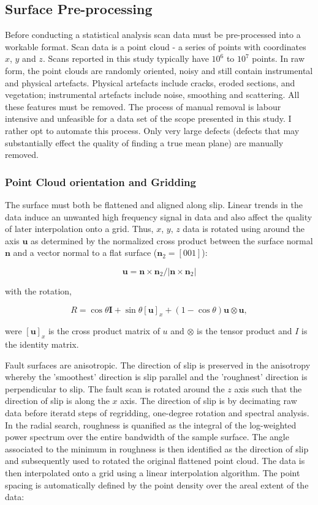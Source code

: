 \documentclass[12pt,a4paper]{article}
\begin{document}
		\subsection{Surface Pre-processing}

Before conducting a statistical analysis scan data must be pre-processed into a workable format. Scan data is a point cloud - a series of points with coordinates $x$, $y$ and $z$. Scans reported in this study typically have $10^6$ to $ 10^7$ points. In raw form, the point clouds are randomly oriented, noisy and still contain instrumental and physical artefacts. Physical artefacts include cracks, eroded sections, and vegetation; instrumental artefacts include noise, smoothing and scattering. All these features must be removed. The process of manual removal is labour intensive and unfeasible for a data set of the scope presented in this study. I rather opt to automate this process. Only very large defects (defects that may substantially effect the quality of finding a true mean plane) are manually removed.

		\subsubsection{Point Cloud orientation and Gridding}

The surface must both be flattened and aligned along slip. Linear trends in the data induce an unwanted high frequency signal in data and also affect the quality of later interpolation onto a grid. Thus, $x$, $y$, $z$ data is rotated using around the axis $\textbf{u}$ as determined by the normalized cross product between the surface normal $\textbf{n}$ and a vector normal to a flat surface ($\textbf{n}_2 = [0 0 1]$): 

$$ \textbf{u} = {\textbf{n}\times\textbf{n}_2}/{|{\textbf{n}\times\textbf{n}_2}|} $$

with the rotation,

$$ R = \cos\theta\textbf{I} + \sin\theta[\textbf{u}]_x+(1-\cos\theta)\textbf{u}\otimes\textbf{u},$$

were $[\textbf{u}]_x$ is the cross product matrix of $u$ and $\otimes$ is the tensor product and $I$ is the identity matrix.

Fault surfaces are anisotropic. The direction of slip is preserved in the anisotropy whereby the 'smoothest' direction is slip parallel and the 'roughnest' direction is perpendicular to slip. The fault scan is rotated around the $z$ axis such that the direction of slip is along the $x$ axis. The direction of slip is by decimating raw data before iteratd steps of regridding, one-degree rotation and spectral analysis. In the radial search, roughness is quanified as the integral of the log-weighted power spectrum over the entire bandwidth of the sample surface. The angle associated to the minimum in roughness is then identified as the direction of slip and subsequently used to rotated the original flattened point cloud. The data is then interpolated onto a grid using a linear interpolation algorithm. The point spacing is automatically defined by the point density over the areal extent of the data:
\end{document}
